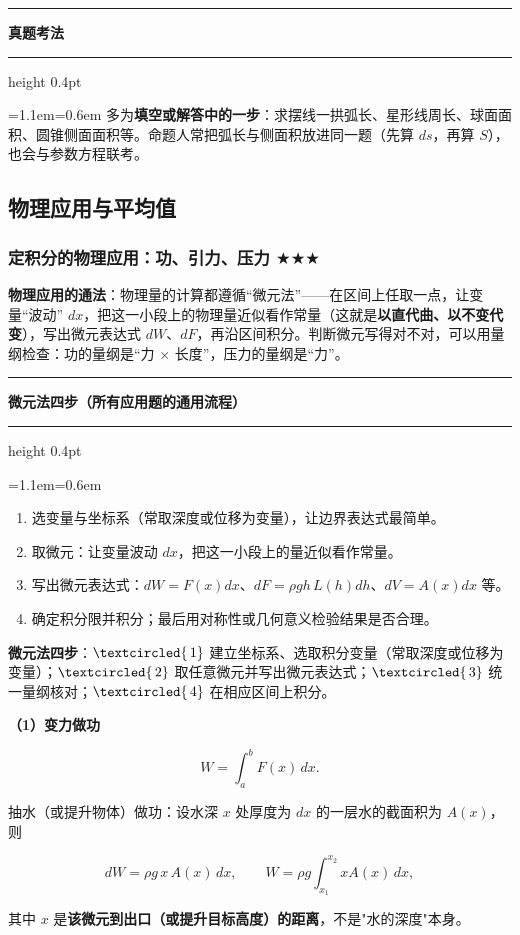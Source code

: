 \documentclass[11pt,openany,UTF8]{ctexbook}
\newcommand{\circled}[1]{\textcircled{\scriptsize\,#1}}
\newcommand{\callouthead}[2]{%
  \par\addvspace{7pt}\noindent
  {\color{#1}\rule[-0.15em]{3pt}{1.05em}}\hspace{0.5em}%
  {\bfseries\color{#1}#2}\par\nobreak\vspace{-0.35em}%
  {\color{rulesep}\hrule height 0.4pt}\nobreak\vspace{0.45em}%
  \begingroup\small\setlength{\parindent}{0pt}%
  \leftskip=1.1em\rightskip=0.6em\noindent\ignorespaces}
\newcommand{\calloutend}{\par\endgroup\addvspace{7pt}}
\newenvironment{callkey}[1]{\callouthead{keybar}{#1}}{\calloutend}
\newenvironment{callexam}[1]{\callouthead{exambar}{#1}}{\calloutend}
\begin{document}
\begin{callexam}{真题考法}
多为\textbf{填空或解答中的一步}：求摆线一拱弧长、星形线周长、球面面积、圆锥侧面面积等。命题人常把弧长与侧面积放进同一题（先算 $ds$，再算 $S$），也会与参数方程联考。

\end{callexam}

\subsection{物理应用与平均值}

\subsubsection{定积分的物理应用：功、引力、压力 $\bigstar$$\bigstar$$\bigstar$}

\textbf{物理应用的通法}：物理量的计算都遵循“微元法”——在区间上任取一点，让变量“波动” $dx$，把这一小段上的物理量近似看作常量（这就是\textbf{以直代曲、以不变代变}），写出微元表达式 $dW$、$dF$，再沿区间积分。判断微元写得对不对，可以用量纲检查：功的量纲是“力 $\times$ 长度”，压力的量纲是“力”。

\begin{callkey}{微元法四步（所有应用题的通用流程）}
\begin{enumerate}
\item 选变量与坐标系（常取深度或位移为变量），让边界表达式最简单。
\item 取微元：让变量波动 $dx$，把这一小段上的量近似看作常量。
\item 写出微元表达式：$dW=F(x)dx$、$dF=\rho gh\,L(h)dh$、$dV=A(x)dx$ 等。
\item 确定积分限并积分；最后用对称性或几何意义检验结果是否合理。
\end{enumerate}
\end{callkey}

\textbf{微元法四步}：$\circled{1}$ 建立坐标系、选取积分变量（常取深度或位移为变量）；$\circled{2}$ 取任意微元并写出微元表达式；$\circled{3}$ 统一量纲核对；$\circled{4}$ 在相应区间上积分。

\textbf{（1）变力做功}

\[W=\int_a^bF(x)\,dx.\]

抽水（或提升物体）做功：设水深 $x$ 处厚度为 $dx$ 的一层水的截面积为 $A(x)$，则

\[dW=\rho g\,x\,A(x)\,dx,\qquad W=\rho g\int_{x_1}^{x_2}xA(x)\,dx,\]

其中 $x$ 是\textbf{该微元到出口（或提升目标高度）的距离}，不是"水的深度"本身。
\end{document}
